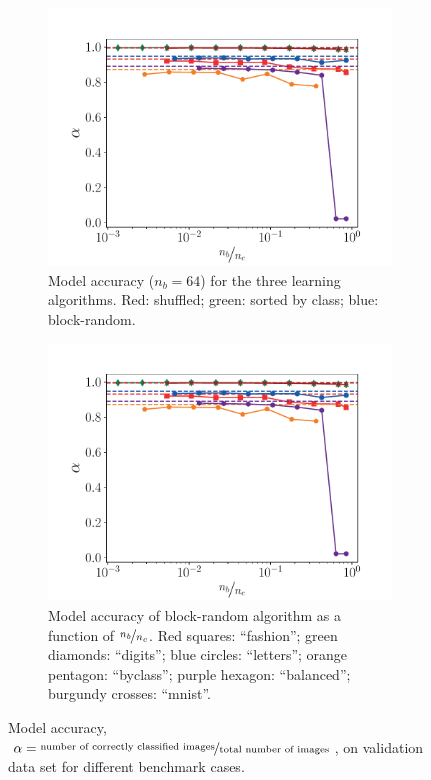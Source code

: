 \documentclass[review]{elsarticle}
\begin{document}
\begin{figure}[!tbp]%
  \centering%
  \begin{subfigure}[t]{0.48\textwidth}%
    \includegraphics[page=2, width=\textwidth]{./figs/benchmark_summary.pdf}%
    \caption{Model accuracy ($n_b=64$) for the three learning algorithms. Red: shuffled; green: sorted by class; blue: block-random.}\label{fig:sum0}%
  \end{subfigure}\hfill%
  \begin{subfigure}[t]{0.48\textwidth}%
    \includegraphics[page=1, width=\textwidth]{./figs/benchmark_summary.pdf}%
    \caption{Model accuracy of block-random algorithm as a function of $\nicefrac{n_b}{n_c}$. Red squares: ``fashion''; green diamonds: ``digits''; blue circles: ``letters''; orange pentagon: ``byclass''; purple hexagon: ``balanced''; burgundy crosses: ``mnist''.}\label{fig:sum1}%
  \end{subfigure}%
  \caption{Model accuracy, $\alpha = \nicefrac{\text{number of correctly classified images}}{\text{total number of images}}$, on validation data set for different benchmark cases.}\label{fig:predictions}%
\end{figure}%
\end{document}
